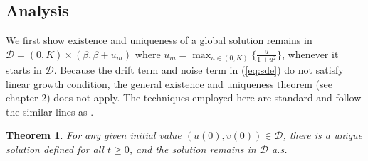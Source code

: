 \documentclass{aims}
\newtheorem{theorem}{Theorem}[section]
\theoremstyle{definition}
\begin{document}
 \subsection{Analysis}
 
 We first show existence and uniqueness of a global solution remains in $\mathcal{D}=(0,K)\times(\beta,\beta+u_{m})$
 where $u_{m}=\max_{u\in(0,K)}\{\frac{u}{1+u^{2}}\}$, whenever it starts in $\mathcal{D}$. Because the drift term and noise term in (\ref{eq:sde}) do not satisfy linear growth condition, the general existence and uniqueness theorem (see \cite{MaoSDEBook} chapter 2) does not apply. The techniques employed here are standard and follow the similar lines as \cite{Wang2017,Gray2011}.
 \begin{theorem}
 \label{thm:exist and unique}For any given initial value $(u(0),v(0))\in\mathcal{D}$,
 there is a unique solution defined for all $t\ge0$, and the solution
 remains in $\mathcal{D}$ a.s.
 \end{theorem}
 
\end{document}
